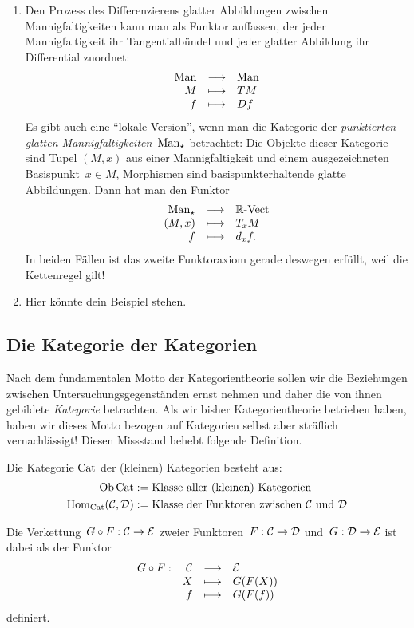\begin{enumerate}
\item Den Prozess des Differenzierens glatter Abbildungen zwischen
Mannigfaltigkeiten kann man als Funktor auffassen, der jeder Mannigfaltigkeit
ihr Tangentialbündel und jeder glatter Abbildung ihr Differential zuordnet:
\[ \begin{array}{@{}rcl@{}}
  \Man &\longrightarrow& \Man \\
  M &\longmapsto& TM \\
  f &\longmapsto& Df
\end{array} \]
Es gibt auch eine "`lokale Version"', wenn man die Kategorie der
\emph{punktierten glatten Mannigfaltigkeiten}~$\mathrm{Man}_\star$ betrachtet: Die
Objekte dieser Kategorie sind Tupel $(M,x)$ aus einer Mannigfaltigkeit und
einem ausgezeichneten Basispunkt~$x \in M$, Morphismen sind
basispunkterhaltende glatte Abbildungen. Dann hat man den Funktor
\[ \begin{array}{@{}rcl@{}}
  \Man_\star &\longrightarrow& \Vect{\RR} \\
  (M,x) &\longmapsto& T_x M \\
  f &\longmapsto& d_x f.
\end{array} \]
In beiden Fällen ist das zweite Funktoraxiom gerade deswegen erfüllt, weil die
Kettenregel gilt!

\item Hier könnte dein Beispiel stehen.
\end{enumerate}


\subsection{Die Kategorie der Kategorien}

Nach dem fundamentalen Motto der Kategorientheorie sollen wir die Beziehungen
zwischen Untersuchungsgegenständen ernst nehmen und daher die von ihnen
gebildete \emph{Kategorie} betrachten. Als wir bisher Kategorientheorie
betrieben haben, haben wir dieses Motto bezogen auf Kategorien selbst aber
sträflich vernachlässigt! Diesen Missstand behebt folgende Definition.
\begin{defn}
Die Kategorie $\mathrm{Cat}$ der (kleinen) Kategorien besteht aus:
\begin{align*}
  \operatorname{Ob} \mathrm{Cat} &:= \text{Klasse aller (kleinen) Kategorien} \\
  \mathrm{Hom}_{\mathrm{Cat}}(\mathcal{C},\mathcal{D}) &:= \text{Klasse der Funktoren zwischen $\mathcal{C}$ und $\mathcal{D}$}
\end{align*}
\end{defn}
Die Verkettung~$G \circ F : \mathcal{C} \to \mathcal{E}$ zweier Funktoren~$F : \mathcal{C} \to \mathcal{D}$ und~$G
: \mathcal{D} \to \mathcal{E}$ ist dabei als der Funktor
\[ \begin{array}{@{}rrcl@{}}
  G \circ F: & \C &\longrightarrow& \E \\
  & X &\longmapsto& G(F(X)) \\
  & f &\longmapsto& G(F(f))
\end{array} \]
definiert.

